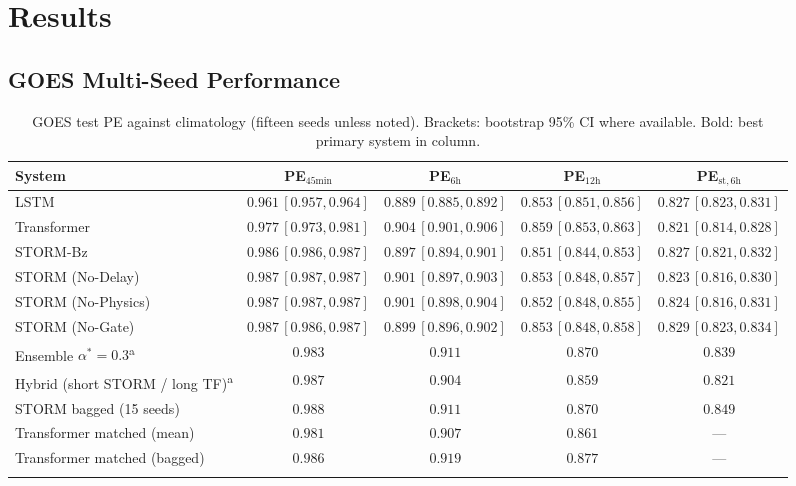 ﻿\documentclass{ieeeaccess}
\begin{document}
\section{Results}
\label{sec:results}

\subsection{GOES Multi-Seed Performance}
\begin{table}[!htbp]
\centering
\caption{GOES test PE against climatology (fifteen seeds unless noted).
Brackets: bootstrap 95\% CI where available. Bold: best primary system in column.}
\label{tab:main}
\begin{tabular}{lcccc}
\toprule
System & PE\(_{45\mathrm{min}}\) & PE\(_{6\mathrm{h}}\) & PE\(_{12\mathrm{h}}\) & PE\(_{\mathrm{st},6\mathrm{h}}\) \\
\midrule
LSTM
  & \(0.961\,[0.957,0.964]\) & \(0.889\,[0.885,0.892]\) & \(0.853\,[0.851,0.856]\) & \(0.827\,[0.823,0.831]\) \\
Transformer
  & \(0.977\,[0.973,0.981]\) & \(0.904\,[0.901,0.906]\) & \(0.859\,[0.853,0.863]\) & \(0.821\,[0.814,0.828]\) \\
STORM-Bz
  & \(0.986\,[0.986,0.987]\) & \(0.897\,[0.894,0.901]\) & \(0.851\,[0.844,0.853]\) & \(0.827\,[0.821,0.832]\) \\
STORM (No-Delay)
  & \(0.987\,[0.987,0.987]\) & \(0.901\,[0.897,0.903]\) & \(0.853\,[0.848,0.857]\) & \(0.823\,[0.816,0.830]\) \\
STORM (No-Physics)
  & \(0.987\,[0.987,0.987]\) & \(0.901\,[0.898,0.904]\) & \(0.852\,[0.848,0.855]\) & \(0.824\,[0.816,0.831]\) \\
STORM (No-Gate)
  & \(0.987\,[0.986,0.987]\) & \(0.899\,[0.896,0.902]\) & \(0.853\,[0.848,0.858]\) & \(0.829\,[0.823,0.834]\) \\
Ensemble \(\alpha^*=0.3\)\textsuperscript{a}
  & \(0.983\) & \(0.911\) & \(0.870\) & \(0.839\) \\
Hybrid (short STORM / long TF)\textsuperscript{a}
  & \(0.987\) & \(0.904\) & \(0.859\) & \(0.821\) \\
STORM bagged (15 seeds)
  & \(\mathbf{0.988}\) & \(0.911\) & \(0.870\) & \(\mathbf{0.849}\) \\
Transformer matched (mean)
  & \(0.981\) & \(0.907\) & \(0.861\) & --- \\
Transformer matched (bagged)
  & \(0.986\) & \(\mathbf{0.919}\) & \(\mathbf{0.877}\) & --- \\
\bottomrule
\multicolumn{5}{p{0.95\textwidth}}{\footnotesize
}
\end{tabular}
\end{table}
\end{document}
